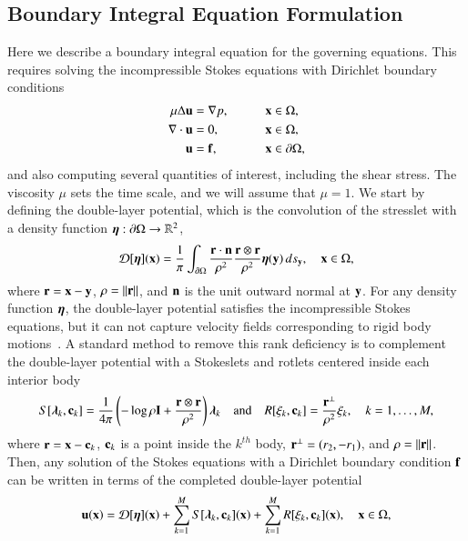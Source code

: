 \documentclass[preprint, 10pt]{elsarticle}
\begin{document}
\subsection{Boundary Integral Equation Formulation} 
\label{sec:bies}
Here we describe a boundary integral equation for the governing
equations.   This requires solving the incompressible Stokes equations
with Dirichlet boundary conditions 
\begin{alignat*}{3}
  \mu\Delta {\mathbf{u}} &= {\nabla} p, \qquad && {\mathbf{x}} \in \Omega, \\
  {\nabla} \cdot {\mathbf{u}} &= 0,   && {\mathbf{x}} \in \Omega, \\
  {\mathbf{u}} &= {\mathbf{f}},  && {\mathbf{x}} \in {\partial}\Omega,
\end{alignat*}
and also computing several quantities of interest, including the shear
stress.  The viscosity $\mu$ sets the time scale, and we will assume
that $\mu=1$.  We start by defining the double-layer potential, which is
the convolution of the stresslet with a density function
${\boldsymbol\eta}:{\partial}\Omega \rightarrow {\mathbb{R}}^2$,
\begin{align}
  {\mathcal{D}}[{\boldsymbol\eta}]({\mathbf{x}}) = \frac{1}{\pi} \int_{{\partial}\Omega} 
    \frac{{\mathbf{r}} \cdot {\mathbf{n}}}{\rho^2} \frac{{\mathbf{r}} \otimes {\mathbf{r}}}{\rho^2} 
    {\boldsymbol\eta}({\mathbf{y}}) \, ds_{\mathbf{y}}, \quad {\mathbf{x}} \in \Omega,
    \label{eqn:velocityDLP}
\end{align}
where ${\mathbf{r}} = {\mathbf{x}} - {\mathbf{y}}$, $\rho = \|{\mathbf{r}}\|$, and ${\mathbf{n}}$ is the unit outward
normal at ${\mathbf{y}}$.  For any density function ${\boldsymbol\eta}$, the double-layer
potential satisfies the incompressible Stokes equations, but it can not
capture velocity fields corresponding to rigid body
motions~\cite{pow-mir1987}.  A standard method to remove this rank
deficiency is to complement the double-layer potential with a Stokeslets
and rotlets centered inside each interior body
\begin{align}
  S[{\boldsymbol\lambda}_k,{\mathbf{c}}_k] = \frac{1}{4\pi} \left(-\log \rho {\mathbf{I}} + 
    \frac{{\mathbf{r}} \otimes {\mathbf{r}}}{\rho^2} \right){\boldsymbol\lambda}_k
  \quad \text{and} \quad
  R[\xi_k,{\mathbf{c}}_k] = \frac{{\mathbf{r}}^\perp}{\rho^2}\xi_k, 
  \quad k=1,\ldots,M,
  \label{eqn:stokeslet_rotlet}
\end{align}
where  ${\mathbf{r}} = {\mathbf{x}} - {\mathbf{c}}_k$, ${\mathbf{c}}_k$ is a point inside the $k^{th}$ body,
${\mathbf{r}}^\perp = (r_2,-r_1)$, and $\rho = \|{\mathbf{r}}\|$.  Then, any solution of
the Stokes equations with a Dirichlet boundary condition ${\mathbf{f}}$ can be
written in terms of the completed double-layer potential
\begin{align}
  \label{eqn:completed_DLP}
  {\mathbf{u}}({\mathbf{x}}) = {\mathcal{D}}[{\boldsymbol\eta}]({\mathbf{x}}) + \sum_{k=1}^{M} S[{\boldsymbol\lambda}_k,{\mathbf{c}}_k]({\mathbf{x}}) +
              \sum_{k=1}^{M} R[\xi_k,{\mathbf{c}}_k]({\mathbf{x}}), \quad {\mathbf{x}} \in \Omega,
\end{align}
\end{document}
